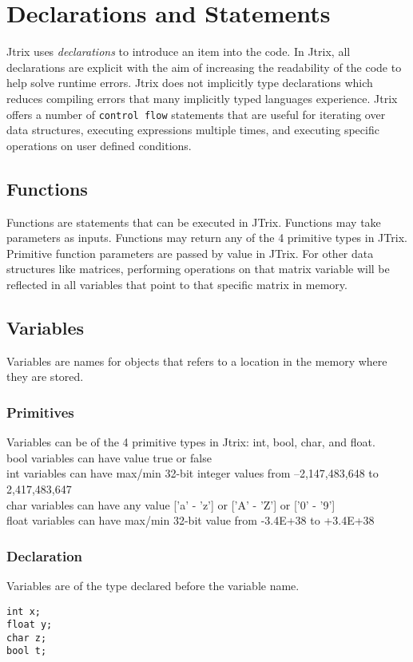 \documentclass[12pt]{report}
\begin{document}
\tableofcontents


\chapter{Declarations and Statements}
Jtrix uses \textit{declarations} to introduce an item into the code. In Jtrix, all declarations are explicit with the aim of increasing the readability of the code to help solve runtime errors. Jtrix does not implicitly type declarations which reduces compiling errors that many implicitly typed languages experience. Jtrix offers a number of \texttt{control flow} statements that are useful for iterating over data structures, executing expressions multiple times, and executing specific operations on user defined conditions. 
\section{Functions}
Functions are statements that can be executed in JTrix. Functions may take parameters as inputs. Functions may return any of the 4 primitive types in JTrix. Primitive function parameters are passed by value in JTrix. For other data structures like matrices, performing operations on that matrix variable will be reflected in all variables that point to that specific matrix in memory. 
\section{Variables}
Variables are names for objects that refers to a location in the memory where they are stored. 
\subsection{Primitives}
Variables can be of the 4 primitive types in Jtrix: int, bool, char, and float.\\ bool variables can have value true or false \\ int variables can have max/min 32-bit integer values from --2,147,483,648 to 2,417,483,647 \\ char variables can have any value ['a' - 'z'] or ['A' - 'Z'] or ['0' - '9'] \\ float variables can have max/min 32-bit value from -3.4E+38 to +3.4E+38 
\subsection{Declaration}
Variables are of the type declared before the variable name. 
\begin{lstlisting}
int x; 
float y; 
char z; 
bool t; 
\end{lstlisting}
\end{document}

